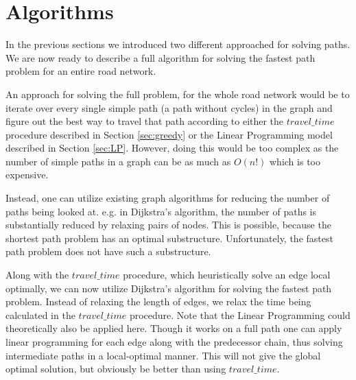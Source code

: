 \section{Algorithms}\label{sec:algo}
In the previous sections we introduced two different approached for solving paths. We are now ready to describe a full algorithm for solving the fastest path problem for an entire road network. 

An approach for solving the full problem, for the whole road network would be to iterate over every single simple path (a path without cycles) in the graph and figure out the best way to travel that path according to either the $travel\_time$ procedure described in Section \ref{sec:greedy} or the Linear Programming model described in Section \ref{sec:LP}. However, doing this would be too complex as the number of simple paths in a graph can be as much as $O(n!)$ which is too expensive.

Instead, one can utilize existing graph algorithms for reducing the number of paths being looked at. e.g. in Dijkstra's algorithm, the number of paths is substantially reduced by relaxing pairs of nodes. This is possible, because the shortest path problem has an optimal substructure. Unfortunately, the fastest path problem does not have such a substructure.

Along with the $travel\_time$ procedure, which heuristically solve an edge local optimally, we can now utilize Dijkstra's algorithm for solving the fastest path problem. Instead of relaxing the length of edges, we relax the time being calculated in the $travel\_time$ procedure. Note that the Linear Programming could theoretically also be applied here. Though it works on a full path one can apply linear programming for each edge along with the predecessor chain, thus solving intermediate paths in a local-optimal manner. This will not give the global optimal solution, but obviously be better than using $travel\_time$.

